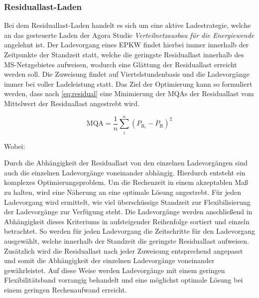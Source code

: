 \subsubsection{Residuallast-Laden}

Bei dem Residuallast-Laden handelt es sich um eine aktive Ladestrategie, welche an das gesteuerte Laden der Agora Studie \textit{Verteilnetzausbau für die Energiewende} \cite{Agora2019} angelehnt ist.
Der Ladevorgang eines \gls{EPKW} findet hierbei immer innerhalb der Zeitpunkte der Standzeit statt, welche die geringste Residuallast innerhalb des \gls{MS}-Netzgebietes aufweisen, wodurch eine Glättung der Residuallast erreicht werden soll.
Die Zuweisung findet auf Viertelstundenbasis und die Ladevorgänge immer bei voller Ladeleistung statt.
Das Ziel der Optimierung kann so formuliert werden, dass nach \autoref{eq:residual} eine Minimierung der \glspl{MQA} der Residuallast vom Mittelwert der Residuallast angestrebt wird.

\begin{equation}
	\text{MQA} = \frac{1}{n} \sum_i^n \left( P_{\text{R}_i} - \overline{P}_{\text{R}} \right)^2
	\label{eq:residual}
\end{equation}

\noindent Wobei:


Durch die Abhängigkeit der Residuallast von den einzelnen Ladevorgängen sind auch die einzelnen Ladevorgänge voneinander abhängig.
Hierdurch entsteht ein komplexes Optimierungsproblem.
Um die Rechenzeit in einem akzeptablen Maß zu halten, wird eine Näherung an eine optimale Lösung angestrebt.
Für jeden Ladevorgang wird ermittelt, wie viel überschüssige Standzeit zur Flexibilisierung der Ladevorgänge zur Verfügung steht.
Die Ladevorgänge werden anschließend in Abhängigkeit dieses Kriteriums in aufsteigender Reihenfolge sortiert und einzeln betrachtet.
So werden für jeden Ladevorgang die Zeitschritte für den Ladevorgang ausgewählt, welche innerhalb der Standzeit die geringste Residuallast aufweisen.
Zusätzlich wird die Residuallast nach jeder Zuweisung entsprechend angepasst und somit die Abhängigkeit der einzelnen Ladevorgänge voneinander gewährleistet.
Auf diese Weise werden Ladevorgänge mit einem geringen Flexibilitätsband vorrangig behandelt und eine möglichst optimale Lösung bei einem geringen Rechenaufwand erreicht.


